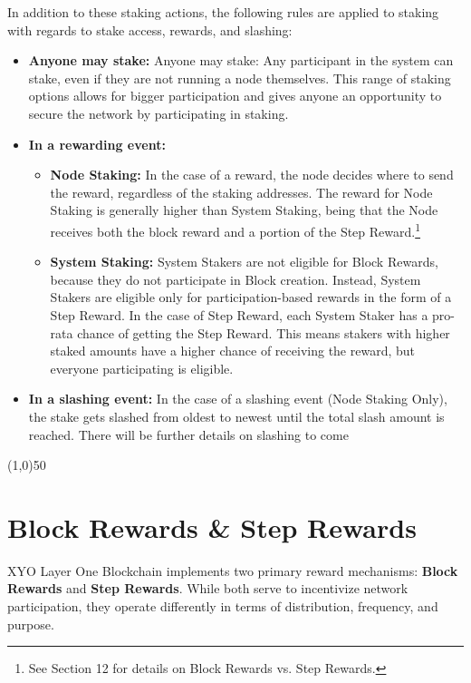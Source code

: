 \documentclass{article}
\begin{document}
In addition to these staking actions, the following rules are applied to
staking with regards to stake access, rewards, and slashing:

\begin{itemize}
    \item \textbf{Anyone may stake:} Anyone may stake: Any participant in the system can stake, even if they are not running a node themselves. This range of staking options allows for bigger participation and gives anyone an opportunity to secure the network by participating in staking.
    \item \textbf{In a rewarding event:} \begin{itemize}
              \item \textbf{Node Staking:} In the case of a reward, the node decides where to send the reward, regardless of the staking addresses. The reward for Node Staking is generally higher than System Staking, being that the Node receives both the block reward and a portion of the Step Reward.\footnote{ See Section 12 for details on Block Rewards vs. Step Rewards.}
              \item \textbf{System Staking:} System Stakers are not eligible for Block Rewards, because they do not participate in Block creation. Instead, System Stakers are eligible only for participation-based rewards in the form of a Step Reward. In the case of Step Reward, each System Staker has a pro-rata chance of getting the Step Reward. This means stakers with higher staked amounts have a higher chance of receiving the reward, but everyone participating is eligible.

          \end{itemize}
    \item \textbf{In a slashing event:} In the case of a slashing event (Node Staking Only), the stake gets slashed from oldest to newest until the total slash amount is reached. There will be further details on slashing to come
\end{itemize}

\begin{center}
    \line(1,0){50}
\end{center}

\section{Block Rewards \& Step Rewards}

XYO Layer One Blockchain implements two primary reward mechanisms:
\textbf{Block Rewards} and \textbf{Step Rewards}. While both serve to
incentivize network participation, they operate differently in terms of
distribution, frequency, and purpose.
\end{document}

